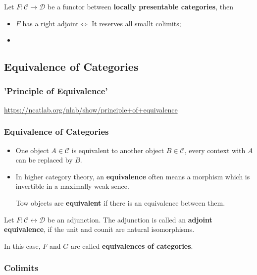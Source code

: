 \documentclass[Total.tex]{subfiles}
\begin{document}
				
				\begin{theorem}
					Let $F:\mathcal{C}\rightarrow\mathcal{D}$ be a functor between \textbf{locally presentable categories}, then
					\begin{itemize}
						\item $F$ has a right adjoint$\Leftrightarrow$ It reserves all smallt colimits;
						\item 
					\end{itemize}
				\end{theorem}
			\subsection{Equivalence of  Categories}
				\subsubsection{'Principle of Equivalence'}
				
				\url{https://ncatlab.org/nlab/show/principle+of+equivalence}
				\subsubsection{Equivalence of Categories}
				\begin{Def}
					\begin{itemize}
						\item One object $A\in \mathcal{C}$ is equivalent to another object $B\in \mathcal{C}$, every context with $A$ can be replaced by $B$.
						
						\item In higher category theory, an \textbf{equivalence} often means a morphism which is invertible in a maximally weak sence.
						
						Tow objects are \textbf{equivalent} if there is an equivalence between them.
					\end{itemize}
				\end{Def}
					\begin{Def}
					Let $F:\mathcal{C}\leftrightarrow \mathcal{D}$ be an adjunction. The adjunction is called an \textbf{adjoint equivalence}, if the unit and counit are natural isomorphisms.
					
					In this case, $F$ and $G$ are called \textbf{equivalences of categories}.
				\end{Def}
			
				\subsubsection{Colimits}
\end{document}

